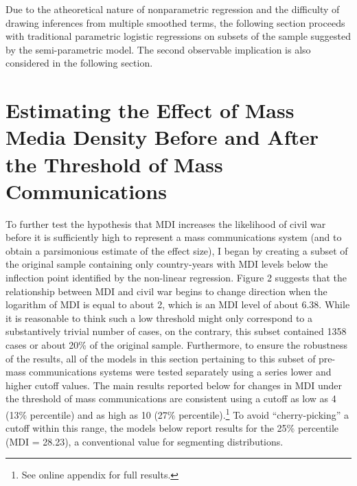\documentclass[11pt,article,oneside]{memoir}
\begin{document}
Due to the atheoretical nature of nonparametric regression and the
difficulty of drawing inferences from multiple smoothed terms, the
following section proceeds with traditional parametric logistic
regressions on subsets of the sample suggested by the semi-parametric
model. The second observable implication is also considered in the
following section.

\section{Estimating the Effect of Mass Media Density Before and After
the Threshold of Mass
Communications}\label{estimating-the-effect-of-mass-media-density-before-and-after-the-threshold-of-mass-communications}

To further test the hypothesis that MDI increases the likelihood of
civil war before it is sufficiently high to represent a mass
communications system (and to obtain a parsimonious estimate of the
effect size), I began by creating a subset of the original sample
containing only country-years with MDI levels below the inflection point
identified by the non-linear regression. Figure 2 suggests that the
relationship between MDI and civil war begins to change direction when
the logarithm of MDI is equal to about 2, which is an MDI level of about
6.38. While it is reasonable to think such a low threshold might only
correspond to a substantively trivial number of cases, on the contrary,
this subset contained 1358 cases or about 20\% of the original sample.
Furthermore, to ensure the robustness of the results, all of the models
in this section pertaining to this subset of pre-mass communications
systems were tested separately using a series lower and higher cutoff
values. The main results reported below for changes in MDI under the
threshold of mass communications are consistent using a cutoff as low as
4 (13\% percentile) and as high as 10 (27\% percentile).\footnote{See
  online appendix for full results.} To avoid ``cherry-picking'' a
cutoff within this range, the models below report results for the 25\%
percentile (MDI = 28.23), a conventional value for segmenting
distributions.
\end{document}
